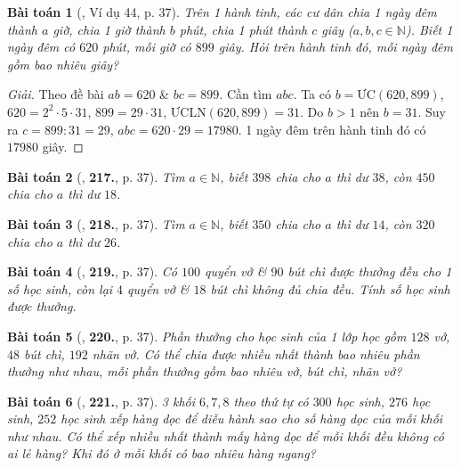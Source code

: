 \documentclass{article}
\numberwithin{equation}{section}
\newtheorem{baitoan}{Bài toán}[section]
\begin{document}
\begin{baitoan}[\cite{Binh_Toan_6_tap_1}, Ví dụ 44, p. 37]
	Trên 1 hành tinh, các cư dân chia 1 ngày đêm thành $a$ giờ, chia 1 giờ thành $b$ phút, chia 1 phút thành $c$ giây ($a,b,c\in\mathbb{N}$). Biết 1 ngày đêm có $620$ phút, mỗi giờ có $899$ giây. Hỏi trên hành tinh đó, mỗi ngày đêm gồm bao nhiêu giây?
\end{baitoan}

\begin{proof}[Giải]
	Theo đề bài $ab = 620$ \& $bc = 899$. Cần tìm $abc$. Ta có $b = \mbox{ƯC}(620,899)$, $620 = 2^2\cdot 5\cdot 31$, $899 = 29\cdot 31$, $\mbox{ƯCLN}(620,899) = 31$. Do $b > 1$ nên $b = 31$. Suy ra $c = 899:31 = 29$, $abc = 620\cdot 29 = 17980$. 1 ngày đêm trên hành tinh đó có $17980$ giây.
\end{proof}

\begin{baitoan}[\cite{Binh_Toan_6_tap_1}, \textbf{217.}, p. 37]
	Tìm $a\in\mathbb{N}$, biết $398$ chia cho $a$ thì dư $38$, còn $450$ chia cho $a$ thì dư $18$.
\end{baitoan}

\begin{baitoan}[\cite{Binh_Toan_6_tap_1}, \textbf{218.}, p. 37]
	Tìm $a\in\mathbb{N}$, biết $350$ chia cho $a$ thì dư $14$, còn $320$ chia cho $a$ thì dư $26$.
\end{baitoan}

\begin{baitoan}[\cite{Binh_Toan_6_tap_1}, \textbf{219.}, p. 37]
	Có $100$ quyển vở \& $90$ bút chì được thưởng đều cho 1 số học sinh, còn lại $4$ quyển vở \& $18$ bút chì không đủ chia đều. Tính số học sinh được thưởng.
\end{baitoan}

\begin{baitoan}[\cite{Binh_Toan_6_tap_1}, \textbf{220.}, p. 37]
	Phần thưởng cho học sinh của 1 lớp học gồm $128$ vở, $48$ bút chì, $192$ nhãn vở. Có thể chia được nhiều nhất thành bao nhiêu phần thưởng như nhau, mỗi phần thưởng gồm bao nhiêu vở, bút chì, nhãn vở?
\end{baitoan}

\begin{baitoan}[\cite{Binh_Toan_6_tap_1}, \textbf{221.}, p. 37]
	3 khối $6,7,8$ theo thứ tự có $300$ học sinh, $276$ học sinh, $252$ học sinh xếp hàng dọc để diễu hành sao cho số hàng dọc của mỗi khối như nhau. Có thể xếp nhiều nhất thành mấy hàng dọc để mỗi khối đều không có ai lẻ hàng? Khi đó ở mỗi khối có bao nhiêu hàng ngang?
\end{baitoan}
\end{document}
